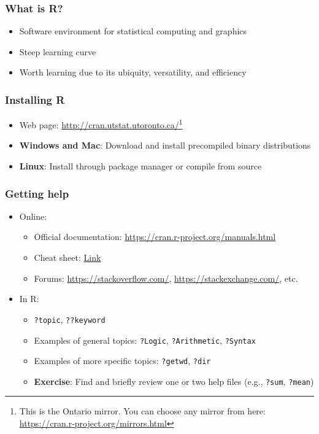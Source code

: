 \documentclass{beamer}
\begin{document}
\begin{frame}
    \frametitle{What is R?}
    \begin{itemize}
      \pause
	  \item Software environment for statistical computing and graphics
      \pause
	  \item Steep learning curve
      \pause
	  \item Worth learning due to its ubiquity, versatility, and efficiency
    \end{itemize}
\end{frame}


\begin{frame}
	\frametitle{Installing R}
	\begin{itemize}
	  \item Web page: \url{http://cran.utstat.utoronto.ca/}\footnote{This is the Ontario mirror. You can choose any mirror from here: \url{https://cran.r-project.org/mirrors.html}}
	  \item \textbf{Windows and Mac}: Download and install precompiled binary distributions
	  \item \textbf{Linux}: Install through package manager or compile from source
	\end{itemize}
\end{frame}


\begin{frame}
    \frametitle{Getting help}
    \begin{itemize}
      \item Online:
      \pause
      \begin{itemize}
	    \item Official documentation: \url{https://cran.r-project.org/manuals.html}
        \pause
	    \item Cheat sheet: \href{https://cran.r-project.org/doc/contrib/Short-refcard.pdf}{Link}
        \pause
	    \item Forums: \url{https://stackoverflow.com/}, \url{https://stackexchange.com/}, etc.
      \end{itemize}
      \pause
	  \item In R:
      \begin{itemize}
        \item \texttt{?topic}, \texttt{??keyword}
        \pause
	    \item Examples of general topics: \texttt{?Logic}, \texttt{?Arithmetic}, \texttt{?Syntax}
        \pause
	    \item Examples of more specific topics: \texttt{?getwd}, \texttt{?dir}
        \pause
        \item \textbf{Exercise}: Find and briefly review one or two help files (e.g., \texttt{?sum}, \texttt{?mean})
      \end{itemize}
    \end{itemize}
\end{frame}
\end{document}
